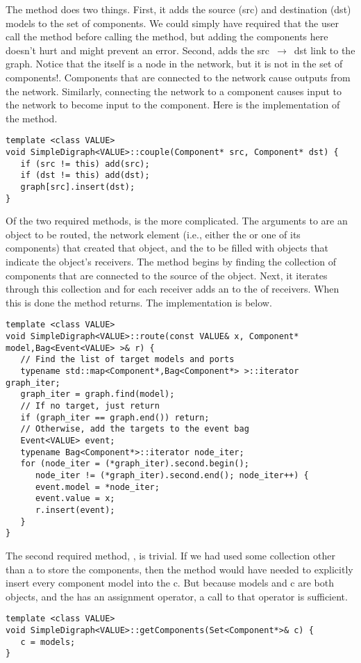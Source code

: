 The  method does two things. First, it adds the source (src) and destination (dst) models to the set of components. We could simply have required that the user call the  method before calling the  method, but adding the components here doesn't hurt and might prevent an error. Second,  adds the \mbox{src $\rightarrow$ dst} link to the graph. Notice that the  itself is a node in the network, but it is not in the set of components!. Components that are connected to the network cause outputs from the network. Similarly, connecting the network to a component causes input to the network to become input to the component. Here is the implementation of the  method.
\begin{verbatim}
template <class VALUE>
void SimpleDigraph<VALUE>::couple(Component* src, Component* dst) { 
   if (src != this) add(src);
   if (dst != this) add(dst);
   graph[src].insert(dst);
}
\end{verbatim}

Of the two required methods,  is the more complicated. The arguments to  are an object to be routed, the network element (i.e., either the  or one of its components) that created that object, and the  to be filled with  objects that indicate the object's receivers. The method begins by finding the collection of components that are connected to the source of the object. Next, it iterates through this collection and for each receiver adds an  to the  of receivers. When this is done the method returns. The implementation is below.
\begin{verbatim}
template <class VALUE>
void SimpleDigraph<VALUE>::route(const VALUE& x, Component* model,Bag<Event<VALUE> >& r) {
   // Find the list of target models and ports
   typename std::map<Component*,Bag<Component*> >::iterator graph_iter;
   graph_iter = graph.find(model);
   // If no target, just return
   if (graph_iter == graph.end()) return;
   // Otherwise, add the targets to the event bag
   Event<VALUE> event;
   typename Bag<Component*>::iterator node_iter;
   for (node_iter = (*graph_iter).second.begin();
      node_iter != (*graph_iter).second.end(); node_iter++) {
      event.model = *node_iter;
      event.value = x;
      r.insert(event);
   }
}
\end{verbatim}

The second required method, , is trivial. If we had used some collection other than a  to store the components, then the method would have needed to explicitly insert every component model into the  c. But because models and c are both  objects, and the  has an assignment operator, a call to that operator is sufficient.
\begin{verbatim}
template <class VALUE>
void SimpleDigraph<VALUE>::getComponents(Set<Component*>& c) {
   c = models;
}
\end{verbatim}

